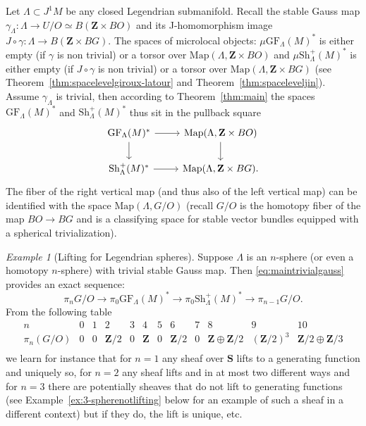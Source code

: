 \documentclass[12pt,a4paper]{article}
\numberwithin{equation}{section}
\theoremstyle{definition}
\theoremstyle{remark}
\newtheorem{example}[equation]{Example}
\newcommand{\Z}{\mathbf{Z}}
\newcommand{\Map}{\mathrm{Map}}
\newcommand{\Sh}{\mathrm{Sh}}
\renewcommand{\S}{\mathbf{S}}
\newcommand{\GF}{\mathrm{GF}}
\begin{document}
Let $\Lambda\subset J^1 M$ be any closed Legendrian submanifold. Recall the stable Gauss map $\gamma_\Lambda : \Lambda \to U/O\simeq B(\Z\times BO)$
and its J-homomorphism image $J\circ\gamma : \Lambda\to B(\Z\times BG)$.
The spaces of microlocal objects: $\mu\GF_\Lambda(M)^*$ is either empty (if $\gamma$ is non trivial) or a torsor over $\Map(\Lambda, \Z\times BO)$
and $\mu \Sh^+_\Lambda(M)^*$ is either empty (if $J\circ\gamma$ is non trivial)
or a torsor over $\Map(\Lambda,\Z\times BG)$  (see Theorem~\ref{thm:spacelevelgiroux-latour} and Theorem~\ref{thm:spaceleveljin}).
Assume $\gamma_\Lambda$ is trivial, then according to Theorem~\ref{thm:main} the spaces $\GF_\Lambda(M)^*$ and $\Sh^+_\Lambda(M)^*$ thus sit in the
pullback square
\begin{equation}\label{eq:maintrivialgauss}
\begin{tikzcd}
\GF_\Lambda(M)^* \arrow[r]\arrow[d]&\Map(\Lambda,\Z\times BO)\arrow[d]\\
\Sh^+_\Lambda(M)^* \arrow[r]& \Map(\Lambda,\Z\times BG).
\end{tikzcd}
\end{equation}
The fiber of the right vertical map (and thus also of the left vertical map) can be identified with the space $\Map(\Lambda, G/O)$ (recall $G/O$
is the homotopy fiber of the map $BO\to BG$ and is a classifying space for stable vector bundles equipped with a spherical trivialization).

\begin{example}[Lifting for Legendrian spheres]\label{ex:liftingspheres}
Suppose $\Lambda$ is an $n$-sphere (or even a homotopy $n$-sphere) with trivial stable Gauss map.
Then \eqref{eq:maintrivialgauss} provides an exact sequence:
\[\pi_n G/O \to \pi_0 \GF_\Lambda(M)^* \to \pi_0 \Sh^+_\Lambda(M)^* \to \pi_{n-1} G/O.\]
From the following table
\begin{equation}\label{eq:pi_nG/O}
    \begin{array}{l|cccccccccccc}
        n & 0 & 1 & 2 & 3 & 4 & 5 & 6 & 7 & 8 & 9 & 10\\ \hline
        \pi_n(G/O) & 0 & 0 & \Z/2 & 0 & \Z & 0 & \Z/2 & 0 & \Z\oplus \Z/2 &(\Z/2)^3  & \Z/2 \oplus \Z/3 \\

    \end{array}
\end{equation}
we learn for instance that for $n=1$ any sheaf over $\S$ lifts to a generating function and uniquely so, for $n=2$ any sheaf lifts and in at most two different ways
and for $n=3$ there are potentially sheaves that do not lift to generating functions (see Example~\ref{ex:3-spherenotlifting} below for an example of such a sheaf in a different context)
but
if they do, the lift is unique, etc.
\end{example}
\end{document}
